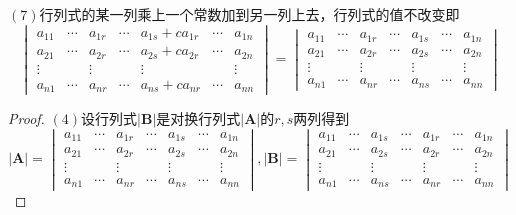 {    $(7)$行列式的某一列乘上一个常数加到另一列上去，行列式的值不改变即\[
        \begin{vmatrix}
            a_{11} & \cdots & a_{1r} & \cdots & a_{1s}+ca_{1r} & \cdots & a_{1n} \\
            a_{21} & \cdots & a_{2r} & \cdots & a_{2s}+ca_{2r} & \cdots & a_{2n} \\
            \vdots &        & \vdots &        & \vdots         &        & \vdots \\
            a_{n1} & \cdots & a_{nr} & \cdots & a_{ns}+ca_{nr} & \cdots & a_{nn}
        \end{vmatrix}=
        \begin{vmatrix}
            a_{11} & \cdots & a_{1r} & \cdots & a_{1s} & \cdots & a_{1n} \\
            a_{21} & \cdots & a_{2r} & \cdots & a_{2s} & \cdots & a_{2n} \\
            \vdots &        & \vdots &        & \vdots &        & \vdots \\
            a_{n1} & \cdots & a_{nr} & \cdots & a_{ns} & \cdots & a_{nn}
        \end{vmatrix}
    \]\begin{proof}
        $(4)$设行列式$\left|\bm{B}\right|$是对换行列式$\left|\bm{A}\right|$的$r,s$两列得到
        \[
            \left|\bm{A}\right|=\begin{vmatrix}
                a_{11} & \cdots & a_{1r} & \cdots & a_{1s} & \cdots & a_{1n} \\
                a_{21} & \cdots & a_{2r} & \cdots & a_{2s} & \cdots & a_{2n} \\
                \vdots &        & \vdots &        & \vdots &        & \vdots \\
                a_{n1} & \cdots & a_{nr} & \cdots & a_{ns} & \cdots & a_{nn}
            \end{vmatrix},\left|\bm{B}\right|=\begin{vmatrix}
                a_{11} & \cdots & a_{1s} & \cdots & a_{1r} & \cdots & a_{1n} \\
                a_{21} & \cdots & a_{2s} & \cdots & a_{2r} & \cdots & a_{2n} \\
                \vdots &        & \vdots &        & \vdots &        & \vdots \\
                a_{n1} & \cdots & a_{ns} & \cdots & a_{nr} & \cdots & a_{nn}
            \end{vmatrix}
        \]


\end{proof}}
